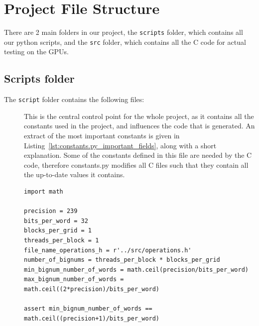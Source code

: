 \documentclass[12pt, a4paper]{report}
\begin{document}
\section{Project File Structure}
There are 2 main folders in our project, the \verb+scripts+ folder, which
contains all our python scripts, and the \verb+src+ folder, which contains all
the C code for actual testing on the GPUs.

\subsection{Scripts folder}
The \verb+script+ folder contains the following files:

\begin{description}
\item[]
This is the central control point for the whole project, as it contains all the
constants used in the project, and influences the code that is generated.
An extract of the most important constants is given in
Listing~\ref{lst:constants.py_important_fields}, along with a short explanation.
Some of the constants defined in this file are needed by the C code, therefore
constants.py modifies all C files such that they contain all the up-to-date
values it contains.

\begin{lstlisting}
import math

precision = 239
bits_per_word = 32
blocks_per_grid = 1
threads_per_block = 1
file_name_operations_h = r'../src/operations.h'
number_of_bignums = threads_per_block * blocks_per_grid
min_bignum_number_of_words = math.ceil(precision/bits_per_word)
max_bignum_number_of_words = math.ceil((2*precision)/bits_per_word)

assert min_bignum_number_of_words == math.ceil((precision+1)/bits_per_word)
\end{lstlisting}


\end{description}
\end{document}
